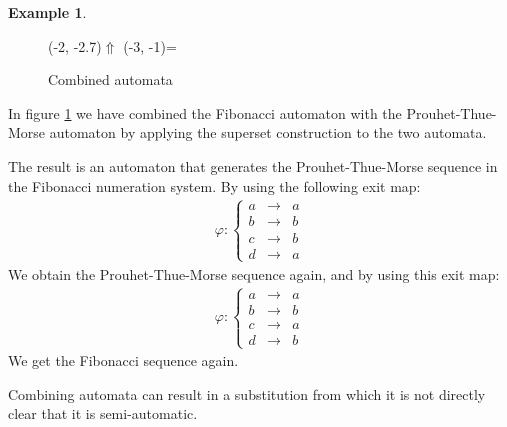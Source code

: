 \documentclass{article}
\theoremstyle{definition}
\newtheorem{example}[theorem]{Example}
\begin{document}
\begin{example}
\begin{figure}[t]
\begin{graph}
  \freetext(-2, -2.7){$\Uparrow$}
  \freetext(-3, -1){=}
\end{graph}
\caption{Combined automata}
\label{fig:combined}
\end{figure}

In figure \ref{fig:combined} we have combined the Fibonacci automaton with the 
Prouhet-Thue-Morse automaton by applying the superset construction to the two 
automata.

The result is an automaton that generates the Prouhet-Thue-Morse sequence in 
the Fibonacci numeration system. By using the following exit map:
\begin{eqnarray*}
\varphi: \left\{ \begin{array}{lll}
a &\rightarrow& a\\
b &\rightarrow& b\\
c &\rightarrow& b\\
d &\rightarrow& a
\end{array} \right.
\end{eqnarray*}
We obtain the Prouhet-Thue-Morse sequence again, and by using this exit map:
\begin{eqnarray*}
\varphi: \left\{ \begin{array}{lll}
a &\rightarrow& a\\
b &\rightarrow& b\\
c &\rightarrow& a\\
d &\rightarrow& b
\end{array} \right.
\end{eqnarray*}
We get the Fibonacci sequence again.
\end{example}

Combining automata can result in a substitution from which it is not directly
clear that it is semi-automatic. 
\end{document}
